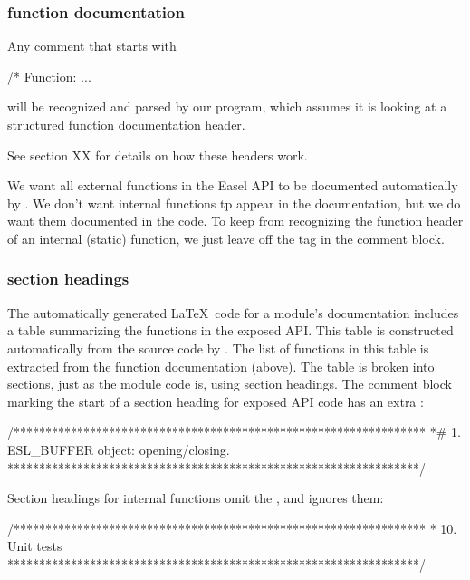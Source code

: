 \subsubsection{function documentation}

Any comment that starts with
\begin{cchunk}
/* Function:  ...
\end{cchunk}
will be recognized and parsed by our  program, 
which assumes it is looking at a structured function documentation
header.

See section XX for details on how these headers work.

We want all external functions in the Easel API to be documented
automatically by . We don't want internal functions tp
appear in the documentation, but we do want them documented in the
code.  To keep  from recognizing the function header of
an internal (static) function, we just leave off the 
tag in the comment block.   

\subsubsection{section headings}

The automatically generated \LaTeX\ code for a module's documentation
includes a table summarizing the functions in the exposed API. This
table is constructed automatically from the source code by
. The list of functions in this table is extracted
from the function documentation (above). The table is broken into
sections, just as the module code is, using section headings. The
comment block marking the start of a section heading for exposed API
code has an extra \ccode{\#}:

\begin{cchunk}
/*****************************************************************
 *# 1. ESL_BUFFER object: opening/closing.
 *****************************************************************/
\end{cchunk}

Section headings for internal functions omit the \ccode{\#}, and
 ignores them:

\begin{cchunk}
/*****************************************************************
 * 10. Unit tests
 *****************************************************************/
\end{cchunk}

